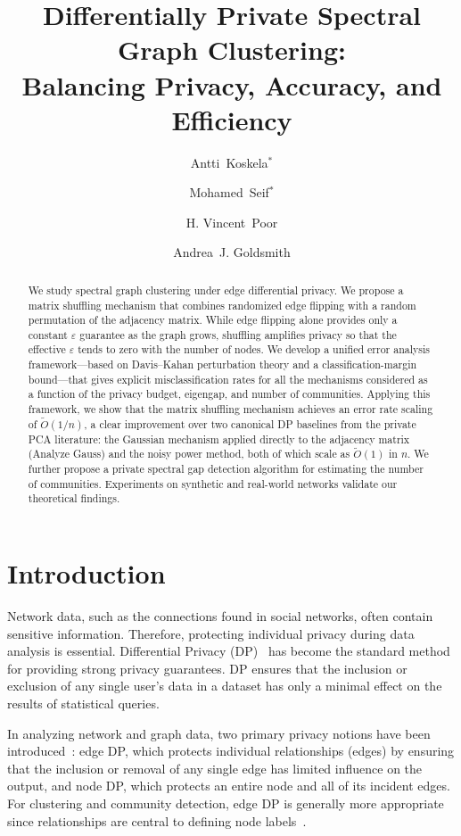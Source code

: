 \documentclass[11pt]{article}
\title{Differentially Private Spectral Graph Clustering: \\ Balancing Privacy, Accuracy, and Efficiency}
\author[1]{Antti~Koskela$^{*}$}
\author[2]{Mohamed~Seif$^{*}$}
\author[2]{H. Vincent~Poor}
\author[2,3]{Andrea~J. Goldsmith}
\affil[1]{\small
Nokia Bell Labs}
\affil[2]{\small
Department of Electrical and Computer Engineering, Princeton University}
\affil[3]{\small
Stony Brook University}
\date{} %
\affil[ ]{\small $^{*}$These authors contributed equally to this work.}
\theoremstyle{plain}
\theoremstyle{definition}
\theoremstyle{remark}
\begin{document}
\maketitle




\begin{abstract}

We study spectral graph clustering under edge differential privacy. We propose a matrix shuffling mechanism that combines randomized edge flipping with a random permutation of the adjacency matrix. While edge flipping alone provides only a constant $\varepsilon$ guarantee as the graph grows, shuffling amplifies privacy so that the effective $\varepsilon$ tends to zero with the number of nodes. We develop a unified error analysis framework---based on Davis--Kahan perturbation theory and a classification-margin bound---that gives explicit misclassification rates for all the  mechanisms considered as a function of the privacy budget, eigengap, and number of communities. Applying this framework, we show that the matrix shuffling mechanism achieves an error rate scaling of $\tilde{O}(1/n)$, a clear improvement over two canonical DP baselines from the private PCA literature: the Gaussian mechanism applied directly to the adjacency matrix (Analyze Gauss) and the noisy power method, both of which scale as $\tilde{O}(1)$ in $n$. We further propose a private spectral gap detection algorithm for estimating the number of communities. Experiments on synthetic and real-world networks validate our theoretical findings.

\end{abstract}

\section{Introduction}

Network data, such as the connections found in social networks, often contain sensitive information. Therefore, protecting individual privacy during data analysis is essential. Differential Privacy (DP)~\citep{dwork2014algorithmic} has become the standard method for providing strong privacy guarantees. DP ensures that the inclusion or exclusion of any single user's data in a dataset has only a minimal effect on the results of statistical queries.

In analyzing network and graph data, two primary privacy notions have been introduced~\citep{karwa2011private, karwa2014private}: edge DP, which protects individual relationships (edges) by ensuring that the inclusion or removal of any single edge has limited influence on the output, and node DP, which protects an entire node and all of its incident edges. For clustering and community detection, edge DP is generally more appropriate since relationships are central to defining node labels~\citep{chen2023private, seif2025differentially, suppakitpaisarn2025locally}.
\end{document}
